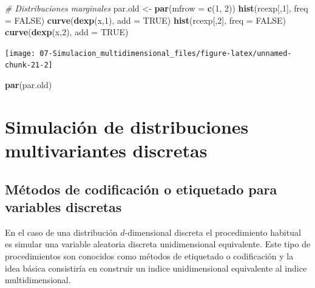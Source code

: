 \documentclass[
]{book}
\newenvironment{Shaded}{\begin{snugshade}}{\end{snugshade}}
\newcommand{\CommentTok}[1]{\textcolor[rgb]{0.56,0.35,0.01}{\textit{#1}}}
\newcommand{\DataTypeTok}[1]{\textcolor[rgb]{0.13,0.29,0.53}{#1}}
\newcommand{\DecValTok}[1]{\textcolor[rgb]{0.00,0.00,0.81}{#1}}
\newcommand{\KeywordTok}[1]{\textcolor[rgb]{0.13,0.29,0.53}{\textbf{#1}}}
\newcommand{\NormalTok}[1]{#1}
\newcommand{\OtherTok}[1]{\textcolor[rgb]{0.56,0.35,0.01}{#1}}
\newcommand{\StringTok}[1]{\textcolor[rgb]{0.31,0.60,0.02}{#1}}
\theoremstyle{break}
\theoremstyle{definition}
\theoremstyle{definition}
\theoremstyle{definition}
\theoremstyle{remark}
\begin{document}
\begin{enumerate}
\begin{Shaded}
\begin{Highlighting}[]
\CommentTok{# Distribuciones marginales}
\NormalTok{par.old <-}\StringTok{ }\KeywordTok{par}\NormalTok{(}\DataTypeTok{mfrow =} \KeywordTok{c}\NormalTok{(}\DecValTok{1}\NormalTok{, }\DecValTok{2}\NormalTok{))}
\KeywordTok{hist}\NormalTok{(rcexp[,}\DecValTok{1}\NormalTok{], }\DataTypeTok{freq =} \OtherTok{FALSE}\NormalTok{)}
\KeywordTok{curve}\NormalTok{(}\KeywordTok{dexp}\NormalTok{(x,}\DecValTok{1}\NormalTok{), }\DataTypeTok{add =} \OtherTok{TRUE}\NormalTok{)}
\KeywordTok{hist}\NormalTok{(rcexp[,}\DecValTok{2}\NormalTok{], }\DataTypeTok{freq =} \OtherTok{FALSE}\NormalTok{)}
\KeywordTok{curve}\NormalTok{(}\KeywordTok{dexp}\NormalTok{(x,}\DecValTok{2}\NormalTok{), }\DataTypeTok{add =} \OtherTok{TRUE}\NormalTok{)}
\end{Highlighting}
\end{Shaded}

  \begin{center}\texttt{[image: 07-Simulacion\_multidimensional\_files/figure-latex/unnamed-chunk-21-2]} \end{center}

\begin{Shaded}
\begin{Highlighting}[]
\KeywordTok{par}\NormalTok{(par.old)}
\end{Highlighting}
\end{Shaded}
\end{enumerate}

\hypertarget{mult-discr}{%
\section{Simulación de distribuciones multivariantes discretas}\label{mult-discr}}

\hypertarget{muxe9todos-de-codificaciuxf3n-o-etiquetado-para-variables-discretas}{%
\subsection{Métodos de codificación o etiquetado para variables discretas}\label{muxe9todos-de-codificaciuxf3n-o-etiquetado-para-variables-discretas}}

En el caso de una distribución \(d\)-dimensional discreta
el procedimiento habitual es simular una variable aleatoria discreta
unidimensional equivalente.
Este tipo de procedimientos son conocidos como métodos de etiquetado o
codificación y la idea básica consistiría en construir un
indice unidimensional equivalente al indice multidimensional.
\end{document}
